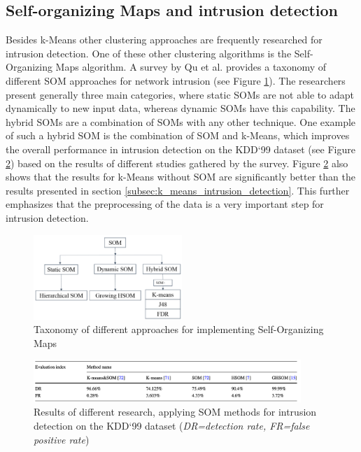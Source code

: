 \documentclass[
    fontsize=12pt,
    headings=small,
    parskip=half,           %
    bibliography=totoc,
    numbers=noenddot,       %
    open=any,               %
    ]{scrreprt}
\begin{document}
\subsection{Self-organizing Maps and intrusion detection}
Besides k-Means other clustering approaches are frequently researched for intrusion detection. One of these other clustering algorithms is the Self-Organizing Maps algorithm. A survey by Qu et al. \cite{qu2021survey} provides a taxonomy of different SOM approaches for network intrusion (see Figure \ref{fig:som_taxonomy}). The researchers present generally three main categories, where static SOMs are not able to adapt dynamically to new input data, whereas dynamic SOMs have this capability. The hybrid SOMs are a combination of SOMs with any other technique. One example of such a hybrid SOM is the combination of SOM and k-Means, which improves the overall performance in intrusion detection on the KDD`99 dataset (see Figure \ref{fig:som_kmeans}) based on the results of different studies gathered by the survey. Figure \ref{fig:som_kmeans} also shows that the results for k-Means without SOM are significantly better than the results presented in section \ref{subsec:k_means_intrusion_detection}. This further emphasizes that the preprocessing of the data is a very important step for intrusion detection.

\begin{figure}[H]
	\sffamily\footnotesize
	\includegraphics[width=0.5\textwidth]{pic/som_taxonomy.png}
	\unitlength=0.5mm
	\linethickness{0.4pt}
	\caption{Taxonomy of different approaches for implementing Self-Organizing Maps \cite{qu2021survey}}
	\label{fig:som_taxonomy}
\end{figure}

\begin{figure}[H]
	\sffamily\footnotesize
	\includegraphics[width=0.9\textwidth]{pic/som_kmeans.png}
	\unitlength=0.5mm
	\linethickness{0.4pt}
	\caption{Results of different research, applying SOM methods for intrusion detection on the KDD`99 dataset (\emph{DR=detection rate, FR=false positive rate}) \cite{qu2021survey}}
	\label{fig:som_kmeans}
\end{figure}
\end{document}

